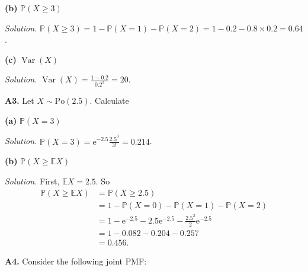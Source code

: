 \documentclass[
  a4paper,
]{book}
\theoremstyle{definition}
\theoremstyle{definition}
\theoremstyle{definition}
\theoremstyle{definition}
\theoremstyle{remark}
\begin{document}
\textbf{(b)} \(\mathbb P(X \geq 3)\)

\begin{myanswers}
\emph{Solution.} \(\mathbb P(X \geq 3) = 1 - \mathbb P(X =1) - \mathbb P(X = 2) = 1 - 0.2 - 0.8\times 0.2 = 0.64\).

\end{myanswers}

\textbf{(c)} \(\operatorname{Var}(X)\)

\begin{myanswers}
\emph{Solution.} \({\displaystyle \operatorname{Var}(X) = \frac{1 - 0.2}{0.2^2} = 20}\).

\end{myanswers}

\textbf{A3.} Let \(X \sim \text{Po}(2.5)\). Calculate

\textbf{(a)} \(\mathbb P(X = 3)\)

\begin{myanswers}
\emph{Solution.}
\(\mathbb P(X = 3) = \mathrm e^{-2.5} \displaystyle\frac{2.5^3}{3!} = 0.214\).

\end{myanswers}

\textbf{(b)} \(\mathbb P(X \geq \mathbb EX)\)

\begin{myanswers}
\emph{Solution.} First, \(\mathbb EX = 2.5\). So
\begin{align*}
\mathbb P(X \geq \mathbb EX) &= \mathbb P(X \geq 2.5) \\
  &= 1 - \mathbb P(X = 0) - \mathbb P(X = 1) - \mathbb P(X = 2) \\
  &= 1 - \mathrm e^{-2.5} - 2.5 \mathrm e^{-2.5} - \frac{2.5^2}{2} \mathrm e^{-2.5} \\
  &= 1 - 0.082 - 0.204 - 0.257 \\
  &= 0.456.
\end{align*}

\end{myanswers}

\textbf{A4.} Consider the following joint PMF:
\end{document}
